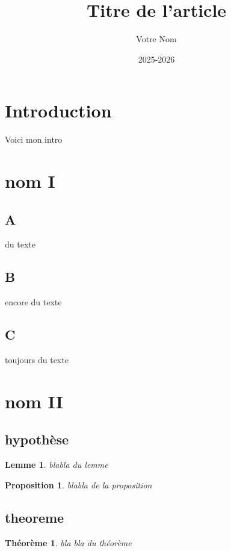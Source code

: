 \documentclass{article}
\title{Titre de l'article}
\author{Votre Nom}
\date{2025-2026}
\newtheorem{theoreme}{Théorème}
\newtheorem{proposition}{Proposition}
\newtheorem{lemme}{Lemme}
\begin{document}
    \maketitle %
    \tableofcontents %
    \newpage %
    
    
    \section{Introduction} %
        Voici mon intro

    \section{nom I}
        \subsection{A} %
            du texte
        \subsection{B} %
            encore du texte
        \subsection{C}
            toujours du texte
    
    \section{nom II}
        \subsection{hypothèse}
            \begin{lemme}
                blabla du lemme
            \end{lemme}
            \begin{proposition}
                blabla de la proposition
            \end{proposition}
        \subsection{theoreme}
            \begin{theoreme}
                bla bla du théorème
            \end{theoreme}
\end{document}

